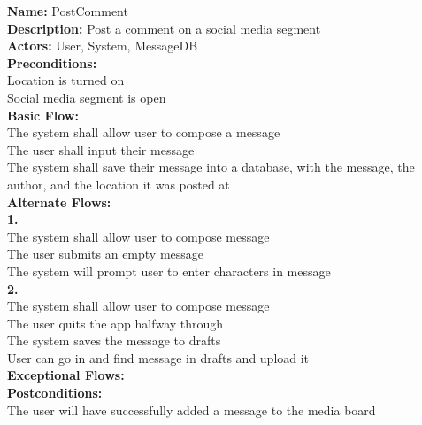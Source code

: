 \documentclass[a4paper]{report}
\begin{document}
\textbf{Name:} PostComment\\
\textbf{Description:} Post a comment on a social media segment\\
\textbf{Actors:} User, System, MessageDB\\
\textbf{Preconditions:}\\
Location is turned on \\
Social media segment is open\\
\textbf{Basic Flow:} \\
The system shall allow user to compose a message\\
The user shall input their message\\
The system shall save their message into a database, with the message, the author, and the location it was posted at\\
\textbf{Alternate Flows:}\\
\textbf{1.}\\
The system shall allow user to compose message \\
The user submits an empty message\\
The system will prompt user to enter characters in message\\
\textbf{2.}\\
The system shall allow user to compose message \\
The user quits the app halfway through\\
The system saves the message to drafts \\
User can go in and find message in drafts and upload it\\
\textbf{Exceptional Flows:}\\
\textbf{Postconditions:}\\
The user will have successfully added a message to the media board\\
\end{document}
